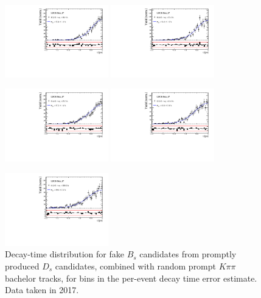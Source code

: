 \begin{figure}[h]
\includegraphics[height=!,width=0.4\textwidth]{figs/Resolution/SignalData_17_bin_7.pdf}
\includegraphics[height=!,width=0.4\textwidth]{figs/Resolution/SignalData_17_bin_8.pdf}

\includegraphics[height=!,width=0.4\textwidth]{figs/Resolution/SignalData_17_bin_9.pdf}
\includegraphics[height=!,width=0.4\textwidth]{figs/Resolution/SignalData_17_bin_10.pdf}

\includegraphics[height=!,width=0.4\textwidth]{figs/Resolution/SignalData_17_bin_11.pdf}
\caption{Decay-time distribution for fake $B_s$ candidates from promptly produced $D_s$ candidates, combined with random prompt $K\pi\pi$ bachelor tracks, for bins in the per-event decay time error estimate. Data taken in 2017.}
\label{fig:}
\end{figure}


